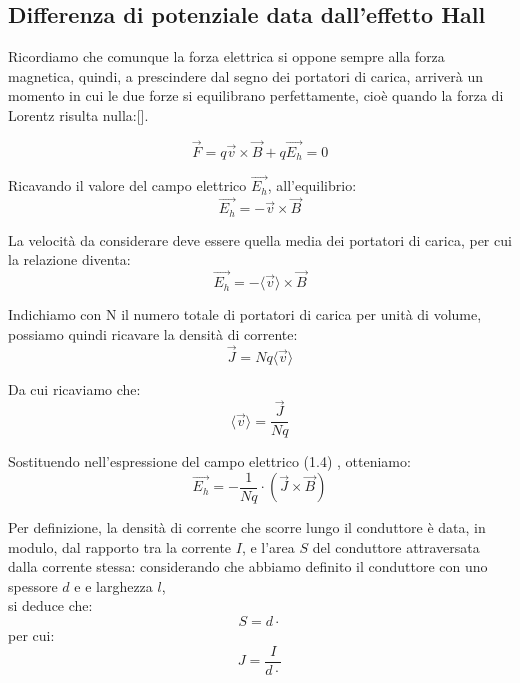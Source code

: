 \subsection{Differenza di potenziale data dall'effetto Hall}

Ricordiamo che comunque la forza elettrica  si oppone sempre alla forza magnetica, quindi, a prescindere dal segno dei portatori di carica, arriverà un momento in cui le due forze si equilibrano perfettamente,
cioè quando la forza di Lorentz risulta nulla:[].

\begin{equation} \label{eqn-1.2}
	\vec{F} = q\vec{v} \times{} \vec{B} + q\vec{E_h} = 0
\end{equation}

Ricavando il valore del campo elettrico $\vec{E_h}$, all’equilibrio:
\begin{equation} \label{eqn-1.3}
	\vec{E_h} = -\vec{v} \times{} \vec{B}
\end{equation}

La velocità da considerare deve essere quella media dei portatori di carica, per
cui la relazione diventa:
\begin{equation} \label{eqn-1.4}
	\vec{E_h} = -\langle{}\vec{v}\rangle{} \times{} \vec{B}
\end{equation}

Indichiamo con N il numero totale di portatori di carica per unità di volume, possiamo quindi ricavare la densità di corrente:
\begin{equation} \label{eqn-1.5}
	\vec{J} = Nq\langle{}\vec{v}\rangle{}
\end{equation}

Da cui ricaviamo che:
\begin{equation} \label{eqn-1.6}
	\langle{}\vec{v}\rangle{} = \frac{\vec{J}}{Nq}
\end{equation}

Sostituendo nell’espressione del campo elettrico (1.4) , otteniamo:
\begin{equation} \label{eqn-1.7}
	\vec{E_h} = -\frac{1}{Nq} \cdot{} (\vec{J}\times{}\vec{B})
\end{equation}

Per definizione, la densità di corrente che scorre lungo il conduttore è data, in
modulo, dal rapporto tra la corrente $I$, e l’area $S$ del conduttore attraversata dalla
corrente stessa: considerando che abbiamo definito il conduttore con uno spessore $d$ e e larghezza $l$,\\ si deduce che: 
\begin{equation} \label{eqn-1.9}
	S = d\cdot{}
\end{equation}
per cui: \\
\begin{equation} \label{eqn-1.9}
	J = \frac{I}{d\cdot{}}
\end{equation}

